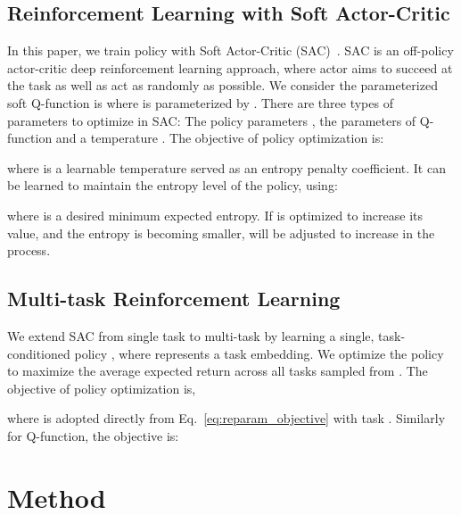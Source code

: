 \documentclass{article}
\begin{document}
\vspace{-0.07in}
\subsection{Reinforcement Learning with Soft Actor-Critic} 
\vspace{-0.07in}

In this paper, we train policy with Soft Actor-Critic (SAC)~\cite{DBLP:journals/corr/abs-1801-01290}. SAC is an off-policy actor-critic deep reinforcement learning approach, where actor aims to succeed at the task as well as act as randomly as possible. We consider the parameterized soft Q-function is  where  is parameterized by . There are three types of parameters to optimize in SAC: The policy parameters , the parameters of Q-function  and a temperature . The objective of policy optimization is:
\vspace{-0.05in}

where  is a learnable temperature served as an entropy penalty coefficient. It can be learned to maintain the entropy level of the policy, using:
\vspace{-0.05in}

where  is a desired minimum expected entropy. If  is optimized to increase its value, and the entropy is becoming smaller,  will be adjusted to increase in the process. 


\vspace{-0.07in}
\subsection{Multi-task Reinforcement Learning}
\vspace{-0.07in}

We extend SAC from single task to multi-task by learning a single, task-conditioned policy , where  represents a task embedding. We optimize the policy to maximize the average expected return across all tasks sampled from .
The objective of policy optimization is,
\vspace{-0.05in}

where  is adopted directly from Eq.~\ref{eq:reparam_objective} with task . Similarly for  Q-function, the objective is:
\vspace{-0.05in}

 
\vspace{-0.1in}
\section{Method}\label{sec:method}
\vspace{-0.1in}
\end{document}
